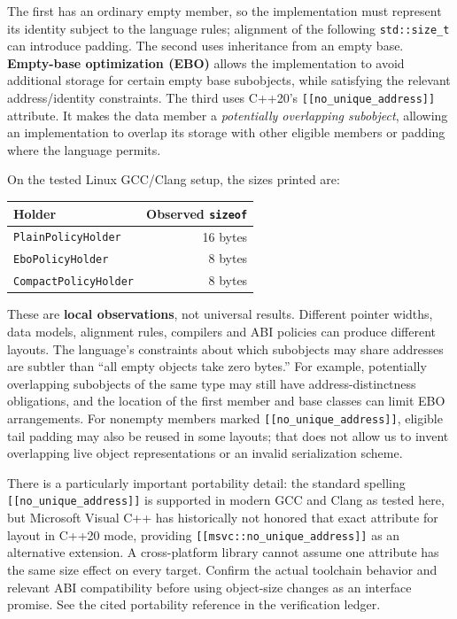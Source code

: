 The first has an ordinary empty member, so the implementation must represent its identity subject to the language rules; alignment of the following \texttt{std::size\_t} can introduce padding. The second uses inheritance from an empty base. \textbf{Empty-base optimization (EBO)} allows the implementation to avoid additional storage for certain empty base subobjects, while satisfying the relevant address/identity constraints. The third uses C++20's \texttt{{[}{[}no\_unique\_address{]}{]}} attribute. It makes the data member a \emph{potentially overlapping subobject}, allowing an implementation to overlap its storage with other eligible members or padding where the language permits.

On the tested Linux GCC/Clang setup, the sizes printed are:

{\def\LTcaptype{none} %
\begin{longtable}[]{@{}lr@{}}
\toprule\noalign{}
Holder & Observed \texttt{sizeof} \\
\midrule\noalign{}
\endhead
\bottomrule\noalign{}
\endlastfoot
\texttt{PlainPolicyHolder} & 16 bytes \\
\texttt{EboPolicyHolder} & 8 bytes \\
\texttt{CompactPolicyHolder} & 8 bytes \\
\end{longtable}
}

These are \textbf{local observations}, not universal results. Different pointer widths, data models, alignment rules, compilers and ABI policies can produce different layouts. The language's constraints about which subobjects may share addresses are subtler than ``all empty objects take zero bytes.'' For example, potentially overlapping subobjects of the same type may still have address-distinctness obligations, and the location of the first member and base classes can limit EBO arrangements. For nonempty members marked \texttt{{[}{[}no\_unique\_address{]}{]}}, eligible tail padding may also be reused in some layouts; that does not allow us to invent overlapping live object representations or an invalid serialization scheme.

There is a particularly important portability detail: the standard spelling \texttt{{[}{[}no\_unique\_address{]}{]}} is supported in modern GCC and Clang as tested here, but Microsoft Visual C++ has historically not honored that exact attribute for layout in C++20 mode, providing \texttt{{[}{[}msvc::no\_unique\_address{]}{]}} as an alternative extension. A cross-platform library cannot assume one attribute has the same size effect on every target. Confirm the actual toolchain behavior and relevant ABI compatibility before using object-size changes as an interface promise. See the cited portability reference in the verification ledger.

